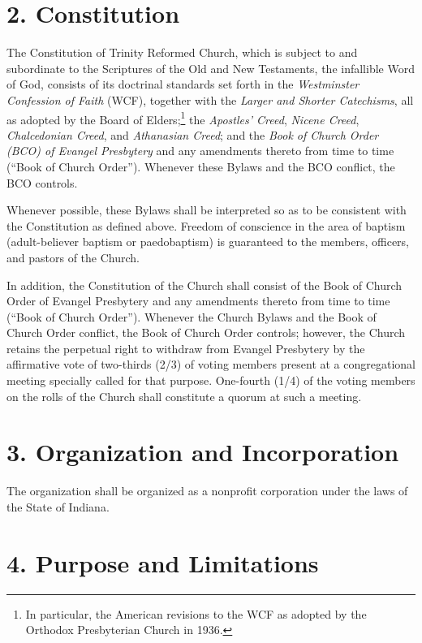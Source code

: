 \documentclass[
]{book}
\begin{document}
\hypertarget{constitution}{%
\section{2. Constitution}\label{constitution}}

The Constitution of Trinity Reformed Church, which is subject to and subordinate to the Scriptures of the Old and New Testaments, the infallible Word of God, consists of its doctrinal standards set forth in the \emph{Westminster Confession of Faith} (WCF), together with the \emph{Larger and Shorter Catechisms}, all as adopted by the Board of Elders;\footnote{In particular, the American revisions to the WCF as adopted by the Orthodox Presbyterian Church in 1936.} the \emph{Apostles' Creed}, \emph{Nicene Creed}, \emph{Chalcedonian Creed}, and \emph{Athanasian Creed}; and the \emph{Book of Church Order (BCO) of Evangel Presbytery} and any amendments thereto from time to time (``Book of Church Order''). Whenever these Bylaws and the BCO conflict, the BCO controls.

Whenever possible, these Bylaws shall be interpreted so as to be consistent with the Constitution as defined above. Freedom of conscience in the area of baptism (adult-believer baptism or paedobaptism) is guaranteed to the members, officers, and pastors of the Church.

In addition, the Constitution of the Church shall consist of the Book of Church Order of Evangel Presbytery and any amendments thereto from time to time (``Book of Church Order''). Whenever the Church Bylaws and the Book of Church Order conflict, the Book of Church Order controls; however, the Church retains the perpetual right to withdraw from Evangel Presbytery by the affirmative vote of two-thirds (2/3) of voting members present at a congregational meeting specially called for that purpose. One-fourth (1/4) of the voting members on the rolls of the Church shall constitute a quorum at such a meeting.

\hypertarget{organization-and-incorporation}{%
\section{3. Organization and Incorporation}\label{organization-and-incorporation}}

The organization shall be organized as a nonprofit corporation under the laws of the State of Indiana.

\hypertarget{purpose-and-limitations}{%
\section{4. Purpose and Limitations}\label{purpose-and-limitations}}
\end{document}
